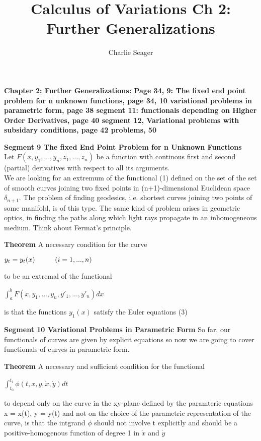 \documentclass{article}
\newcommand\tab[1][1cm]{\hspace*{#1}}
\begin{document}
\title {Calculus of Variations Ch 2: Further Generalizations}

\author{Charlie Seager}

\maketitle

\textbf {Chapter 2: Further Generalizations: Page 34, 9: The fixed end point problem for n unknown functions, page 34, 10 variational problems in parametric form, page 38 segment 11: functionals depending on Higher Order Derivatives, page 40 segment 12, Variational problems with subsidary conditions, page 42 problems, 50}

\textbf {Segment 9 The fixed End Point Problem for n Unknown Functions}
\\
Let $F(x, y_1,..., y_n, z_1 ,..., z_n)$ be a function with continous first and second (partial) derivatives with respect to all its arguments.
\\
We are looking for an extremum of the functional (1) defined on the set of the set of smooth curves joining two fixed points in (n+1)-dimensional Euclidean space $\delta_{n+1}$. The problem of finding geodesics, i.e. shortest curves joining two points of some manifold, is of this type. The same kind of problem arises in geometric optics, in finding the paths along which light rays propagate in an inhomogeneous medium. Think about Fermat's principle.

\textbf {Theorem} A necessary condition for the curve
\begin{center}
$y_t = y_t(x) \tab (i = 1 ,..., n)$
\end{center}
to be an extremal of the functional
\begin{center}
$\int_a^b F(x, y_1 ,..., y_n , y'_1 ,..., y'_n) dx$
\end{center}
is that the functions $y_1(x)$ satisfy the Euler equations (3)

\textbf {Segment 10 Variational Problems in Parametric Form} So far, our functionals of curves are given by explicit equations so now we are going to cover functionals of curves in parametric form.

\textbf {Theorem} A necessary and sufficient condition for the functional
\begin{center}
$\int_{t_0}^{t_1} \phi (t, x, y, \dot{x}, \dot{y}) dt$
\end{center}
to depend only on the curve in the xy-plane defined by the paramteric equations x = x(t), y = y(t) and not on the choice of the parametric representation of the curve, is that the intgrand $\phi$ should not involve t explicitly and should be a positive-homogenous function of degree 1 in $\dot{x}$ and $\dot{y}$
\end{document}
